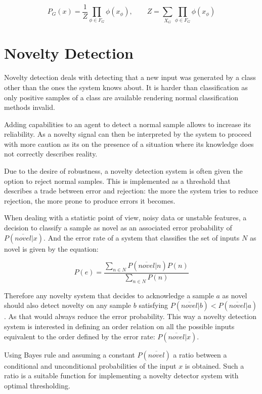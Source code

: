 \documentclass[runningheads,a4paper]{llncs}
\begin{document}
\begin{equation}
P_G(x) = \frac{1}{Z}\prod_{\phi \in F_G}{\phi(x_{\phi})},\qquad
Z = \sum_{X_G}\prod_{\phi \in F_G}{\phi(x_{\phi})}
\end{equation}


\section{Novelty Detection}
Novelty detection deals with detecting that a new input was generated by a class
other than the ones the system knows about\cite{markou2003novelty}.
It is harder than classification as only positive samples of a class are available
rendering normal classification methods invalid.

Adding capabilities to an agent to detect a normal sample allows to increase its
reliability. As a novelty signal can then be interpreted by the system to proceed
with more caution as its on the presence of a situation where its knowledge
does not correctly describes reality.

Due to the desire of robustness, a novelty detection system is often given the option
to reject normal samples. This is implemented as a threshold that describes a trade
between error and rejection: the more the system tries to reduce rejection, the more
prone to produce errors it becomes.

When dealing with a statistic point of view, noisy data or unstable features, a decision to
classify a sample as novel as an associated error probability of $P(\overline{novel}|x)$.
And the error rate of a system that classifies the set of inputs $N$ as novel is given by
the equation:

\begin{equation}
P(e) = \frac{\sum_{n \in N}{P(\overline{novel}|n)P(n)}}{\sum_{n \in N}{P(n)}}
\end{equation}

Therefore any novelty system that decides to acknowledge a sample
$a$ as novel should also detect novelty on any sample $b$ satisfying
$P(\overline{novel}|b) < P(\overline{novel}|a)$.
As that would always reduce the error probability.
This way a novelty detection system is interested in defining an
order relation on all the possible inputs equivalent to the order defined by
the error rate: $P(\overline{novel}|x)$.

Using Bayes rule and assuming a constant $P(\overline{novel})$
a ratio between a conditional and unconditional probabilities of the input $x$ is obtained.
Such a ratio is a suitable function for implementing a novelty detector system with optimal
thresholding.
\end{document}

